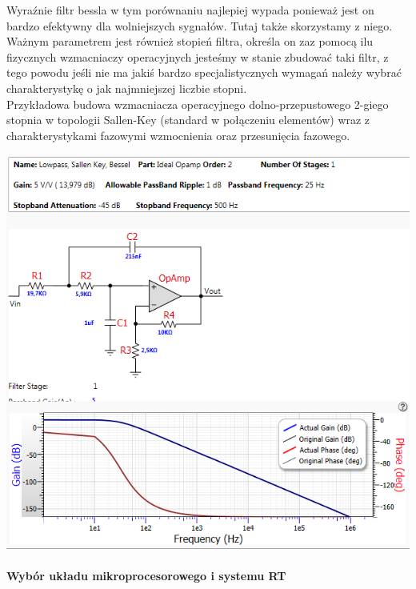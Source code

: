 Wyraźnie filtr bessla w tym porównaniu najlepiej wypada ponieważ jest on bardzo efektywny dla wolniejszych sygnałów. Tutaj także skorzystamy z niego. \\
Ważnym parametrem jest również stopień filtra, określa on zaz pomocą ilu fizycznych wzmacniaczy operacyjnych jesteśmy w stanie zbudować taki filtr, z tego powodu jeśli nie ma jakiś bardzo specjalistycznych wymagań należy wybrać charakterystykę o jak najmniejszej liczbie stopni. \\

Przykładowa budowa wzmacniacza operacyjnego dolno-przepustowego 2-giego stopnia w topologii Sallen-Key (standard w połączeniu elementów) wraz z charakterystykami fazowymi wzmocnienia oraz przesunięcia fazowego.

\centerline{\includegraphics[scale=0.40]{./img/target_system/filtr/filter_design.png}} 

\paragraph{Wybór układu mikroprocesorowego i systemu RT}

